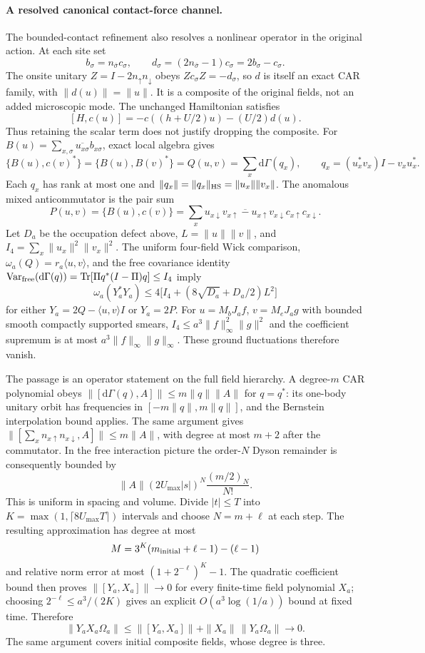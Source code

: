 \paragraph{A resolved canonical contact-force channel.}
The bounded-contact refinement also resolves a nonlinear operator in the
original action. At each site set
\[
 b_\sigma=n_{\bar\sigma}c_\sigma,
 \qquad d_\sigma=(2n_{\bar\sigma}-1)c_\sigma=2b_\sigma-c_\sigma.
\]
The onsite unitary $Z=I-2n_\uparrow n_\downarrow$ obeys
$Zc_\sigma Z=-d_\sigma$, so $d$ is itself an exact CAR family, with
$\|d(u)\|=\|u\|$. It is a composite of the original fields, not an added
microscopic mode. The unchanged Hamiltonian satisfies
\[
 [H,c(u)]=-c((h+U/2)u)-(U/2)d(u).
\]
Thus retaining the scalar term does not justify dropping the composite.
For $B(u)=\sum_{x,\sigma}\overline{u_{x\sigma}}b_{x\sigma}$, exact local
algebra gives
\[
 \{B(u),c(v)^*\}=\{B(u),B(v)^*\}
 =Q(u,v)=\sum_x\mathrm d\Gamma(q_x),
 \qquad q_x=(u_x^*v_x)I-v_xu_x^*.
\]
Each $q_x$ has rank at most one and
$\|q_x\|=\|q_x\|_{\rm HS}=\|u_x\|\|v_x\|$.
The anomalous mixed anticommutator is the pair sum
\[
 P(u,v)=\{B(u),c(v)\}
 =\sum_x\overline{u_{x\downarrow}v_{x\uparrow}
                  -u_{x\uparrow}v_{x\downarrow}}
                 c_{x\uparrow}c_{x\downarrow}.
\]
Let $D_a$ be the occupation defect above, $L=\|u\|\|v\|$, and
$I_4=\sum_x\|u_x\|^2\|v_x\|^2$. The uniform four-field Wick comparison,
$\omega_a(Q)=r_a\langle u,v\rangle$, and the free covariance identity
$\operatorname{Var}_{\rm free}(\mathrm d\Gamma(q))
 =\operatorname{Tr}[\Pi q^*(I-\Pi)q]\leq I_4$ imply
\[
 \omega_a(Y_a^*Y_a)
 \leq4\bigl[I_4+(8\sqrt{D_a}+D_a/2)L^2\bigr]
\]
for either $Y_a=2Q-\langle u,v\rangle I$ or $Y_a=2P$.
For $u=M_bJ_af$, $v=M_eJ_ag$ with bounded smooth compactly supported
smears, $I_4\leq a^3\|f\|_\infty^2\|g\|^2$ and the coefficient
supremum is at most $a^3\|f\|_\infty\|g\|_\infty$. These ground
fluctuations therefore vanish.

The passage is an operator statement on the full field hierarchy.
A degree-$m$ CAR polynomial obeys
$\|[\mathrm d\Gamma(q),A]\|\leq m\|q\|\|A\|$ for $q=q^*$:
its one-body unitary orbit has frequencies in
$[-m\|q\|,m\|q\|]$, and the Bernstein interpolation bound applies.
The same argument gives
$\|[\sum_x n_{x\uparrow}n_{x\downarrow},A]\|\leq m\|A\|$,
with degree at most $m+2$ after the commutator. In the free interaction
picture the order-$N$ Dyson remainder is consequently bounded by
\[
 \|A\|(2U_{\max}|s|)^N\frac{(m/2)_N}{N!}.
\]
This is uniform in spacing and volume. Divide $|t|\leq T$ into
$K=\max(1,\lceil8U_{\max}T\rceil)$ intervals and choose $N=m+\ell$
at each step. The resulting approximation has degree at most
\[
 M=3^K(m_{\rm initial}+\ell-1)-(\ell-1)
\]
and relative norm error at most $(1+2^{-\ell})^K-1$.
The quadratic coefficient bound then proves
$\|[Y_a,X_a]\|\to0$ for every finite-time field polynomial $X_a$;
choosing $2^{-\ell}\leq a^3/(2K)$ gives an explicit
$O(a^3\log(1/a))$ bound at fixed time. Therefore
\[
 \|Y_aX_a\Omega_a\|
 \leq\|[Y_a,X_a]\|+\|X_a\|\,\|Y_a\Omega_a\|\longrightarrow0.
\]
The same argument covers initial composite fields, whose degree is three.

